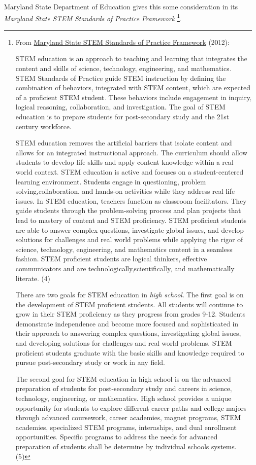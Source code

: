 \documentclass[letterpaper,10pt,english]{sphinxmanual}
\begin{document}
Maryland State Department of Education gives this some consideration in its \emph{Maryland State STEM Standards of Practice Framework} \footnote{
From \href{http://mdk12.org/instruction/academies/MDSTEM\_Framework\_Grades6-12.pdf}{Maryland State STEM Standards of Practice Framework} (2012):

STEM education is an approach to teaching and learning that integrates the content and skills of science, technology, engineering, and mathematics. STEM Standards of Practice guide STEM instruction by defining the combination of behaviors, integrated with STEM content, which are expected of a proficient STEM student. These behaviors include engagement in inquiry, logical reasoning, collaboration, and investigation. The goal of STEM education is to prepare students for post-secondary study and the 21st century workforce.

STEM education removes the artificial barriers that isolate content and allows for an integrated instructional approach. The curriculum should allow students to develop life skills and apply content knowledge within a real world context. STEM education is active and focuses on a student-centered learning environment. Students engage in questioning, problem solving,collaboration, and hands-on activities while they address real life issues. In STEM education, teachers function as classroom facilitators. They guide students through the problem-solving process and plan projects that lead to mastery of content and STEM proficiency. STEM proficient students are able to answer complex questions, investigate global issues, and develop solutions for challenges and real world problems while applying the rigor of science, technology, engineering, and mathematics content in a seamless fashion. STEM proficient students are logical thinkers, effective communicators and are technologically,scientifically, and mathematically literate. (4)

There are two goals for STEM education in \emph{high school}. The first goal is on the development of STEM proficient students. All students will continue to grow in their STEM proficiency as they progress from grades 9-12. Students demonstrate independence and become more focused and sophisticated in their approach to answering complex questions, investigating global issues, and developing solutions for challenges and real world problems. STEM proficient students graduate with the basic skills and knowledge required to pursue post-secondary study or work in any field.

The second goal for STEM education in high school is on the advanced preparation of students for post-secondary study and careers in science, technology, engineering, or mathematics. High school provides a unique opportunity for students to explore different career paths and college majors through advanced coursework, career academies, magnet programs, STEM academies, specialized STEM programs, internships, and dual enrollment opportunities. Specific programs to address the needs for advanced preparation of students shall be determine by individual schools systems. (5)
}.
\end{document}
